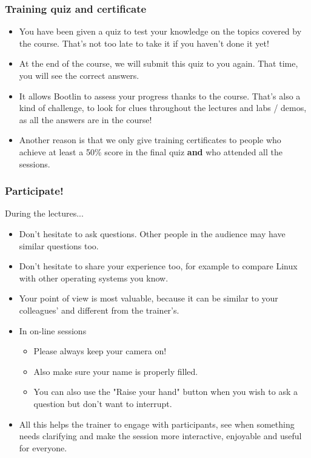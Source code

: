 \begin{frame}
\frametitle{Training quiz and certificate}
\begin{itemize}
\item You have been given a quiz to test your knowledge
      on the topics covered by the course.
      That's not too late to take it if you haven't done it yet!
\item At the end of the course, we will submit this quiz
      to you again. That time, you will see the correct answers.
\item It allows Bootlin to assess your progress thanks to the course.
      That's also a kind of challenge, to look for clues throughout
      the lectures and labs / demos, as all the answers are in the course!
\item Another reason is that we only give training certificates
      to people who achieve at least a 50\% score in the final quiz
      {\bf and} who attended all the sessions.
\end{itemize}
\end{frame}

\begin{frame}

\frametitle{Participate!}
During the lectures...
\begin{itemize}
\item Don't hesitate to ask questions. Other people in the audience may have
similar questions too.
\item Don't hesitate to share your experience too, for example to compare Linux
with other operating systems you know.
\item Your point of view is most valuable, because it can be similar to your
colleagues' and different from the trainer's.
\item In on-line sessions
   \begin{itemize}
   \item Please always keep your camera on!
   \item Also make sure your name is properly filled.
   \item You can also use the "Raise your hand" button when you wish to
         ask a question but don't want to interrupt.
   \end{itemize}
\item All this helps the trainer to engage with participants, see when
something needs clarifying and make the session more interactive, enjoyable
and useful for everyone.
\end{itemize}
\end{frame}


